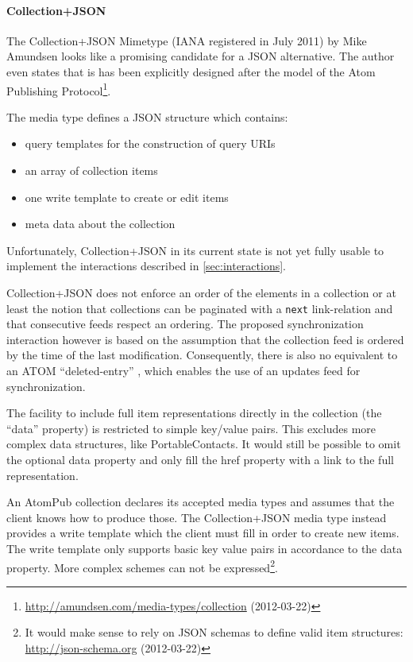 \documentclass[11pt,a4paper,headsepline,twoside]{scrartcl}		%
\newcommand{\citeurl}[2]{\url{#1} (#2)}
\begin{document}
\paragraph{Collection+JSON}
\label{sec:collection+json}

The Collection+JSON Mimetype (IANA registered in July 2011) by Mike
Amundsen \cite{Amundsen2011a}\cite[ch. 3]{amundsen2011building} looks like a
promising candidate for a JSON alternative. The author even states that is has
been explicitly designed after the model of the Atom Publishing
Protocol\footnote{\citeurl{http://amundsen.com/media-types/collection}{2012-03-22}}.

The media type defines a JSON structure which contains:

\begin{itemize}
\item query templates for the construction of query URIs
\item an array of collection items
\item one write template to create or edit items
\item meta data about the collection
\end{itemize}

Unfortunately, Collection+JSON in its current state is not yet fully usable to
implement the interactions described in \ref{sec:interactions}.

Collection+JSON does not enforce an order of the elements in a collection or at
least the notion that collections can be paginated with a \lstinline:next:
link-relation and that consecutive feeds respect an ordering. The proposed
synchronization interaction however is based on the assumption that the
collection feed is ordered by the time of the last modification. Consequently,
there is also no equivalent to an ATOM ``deleted-entry''
\cite{draft-snell-atompub-tombstones-14}, which enables the use of an updates
feed for synchronization.

The facility to include full item representations directly in the collection
(the ``data'' property) is restricted to simple key/value pairs. This excludes
more complex data structures, like PortableContacts. It would still be possible
to omit the optional data property and only fill the href property with a link
to the full representation.

An AtomPub collection declares its accepted media types and assumes that the
client knows how to produce those. The Collection+JSON media type instead
provides a write template which the client must fill in order to create new
items. The write template only supports basic key value pairs in accordance to
the data property. More complex schemes can not be expressed\footnote{It would
  make sense to rely on JSON schemas to define valid item structures:
  \citeurl{http://json-schema.org}{2012-03-22}}.
\end{document}
